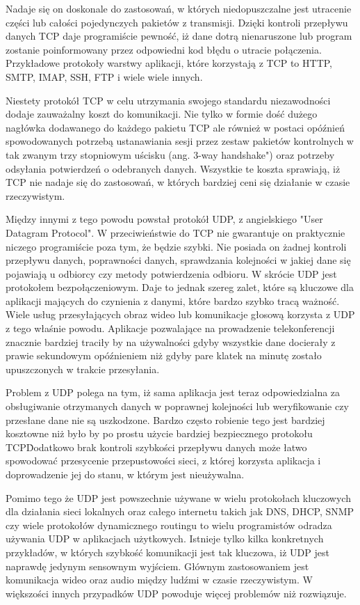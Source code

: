 \documentclass[10pt]{article}
\begin{document}
Nadaje się on doskonale do zastosowań, w których niedopuszczalne jest utracenie części lub całości pojedynczych pakietów z transmisji. Dzięki kontroli przepływu danych TCP daje programiście pewność, iż dane dotrą nienaruszone lub program zostanie poinformowany przez odpowiedni kod błędu o utracie połączenia. Przykładowe protokoły warstwy aplikacji, które korzystają z TCP to HTTP, SMTP, IMAP, SSH, FTP i wiele wiele innych.

Niestety protokół TCP w celu utrzymania swojego standardu niezawodności dodaje zauważalny koszt do komunikacji. Nie tylko w formie dość dużego nagłówka dodawanego do każdego pakietu TCP ale również w postaci opóźnień spowodowanych potrzebą ustanawiania sesji przez zestaw pakietów kontrolnych w tak zwanym trzy stopniowym uścisku (ang. 3-way handshake") oraz potrzeby odsyłania potwierdzeń o odebranych danych. Wszystkie te koszta sprawiają, iż TCP nie nadaje się do zastosowań, w których bardziej ceni się działanie w czasie rzeczywistym.

Między innymi z tego powodu powstał protokół UDP, z angielskiego "User Datagram Protocol". W przeciwieństwie do TCP nie gwarantuje on praktycznie niczego programiście poza tym, że będzie szybki. Nie posiada on żadnej kontroli przepływu danych, poprawności danych, sprawdzania kolejności w jakiej dane się pojawiają u odbiorcy czy metody potwierdzenia odbioru. W skrócie UDP jest protokołem bezpołączeniowym. Daje to jednak szereg zalet, które są kluczowe dla aplikacji mających do czynienia z danymi, które bardzo szybko tracą ważność. Wiele usług przesyłających obraz wideo lub komunikacje głosową korzysta z UDP z tego właśnie powodu. Aplikacje pozwalające na prowadzenie telekonferencji znacznie bardziej traciły by na używalności gdyby wszystkie dane docierały z prawie sekundowym opóźnieniem niż gdyby pare klatek na minutę zostało upuszczonych w trakcie przesyłania.

Problem z UDP polega na tym, iż sama aplikacja jest teraz odpowiedzialna za obsługiwanie otrzymanych danych w poprawnej kolejności lub weryfikowanie czy przesłane dane nie są uszkodzone. Bardzo często robienie tego jest bardziej kosztowne niż było by po prostu użycie bardziej bezpiecznego protokołu TCP\. Dodatkowo brak kontroli szybkości przepływu danych może łatwo spowodować przesycenie przepustowości sieci, z której korzysta aplikacja i doprowadzenie jej do stanu, w którym jest nieużywalna.

Pomimo tego że UDP jest powszechnie używane w wielu protokołach kluczowych dla działania sieci lokalnych oraz całego internetu takich jak DNS, DHCP, SNMP czy wiele protokołów dynamicznego routingu to wielu programistów odradza używania UDP w aplikacjach użytkowych. Istnieje tylko kilka konkretnych przykładów, w których szybkość komunikacji jest tak kluczowa, iż UDP jest naprawdę jedynym sensownym wyjściem. Głównym zastosowaniem jest komunikacja wideo oraz audio między ludźmi w czasie rzeczywistym. W większości innych przypadków UDP powoduje więcej problemów niż rozwiązuje.
\end{document}
